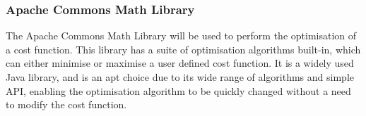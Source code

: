 \subsubsection{Apache Commons Math Library}

The Apache Commons Math Library\cite{apachemath} will be used to perform the optimisation of a cost function. This library has a suite of optimisation algorithms built-in, which can either minimise or maximise a user defined cost function. It is a widely used Java library, and is an apt choice due to its wide range of algorithms and simple API, enabling the optimisation algorithm to be quickly changed without a need to modify the cost function.